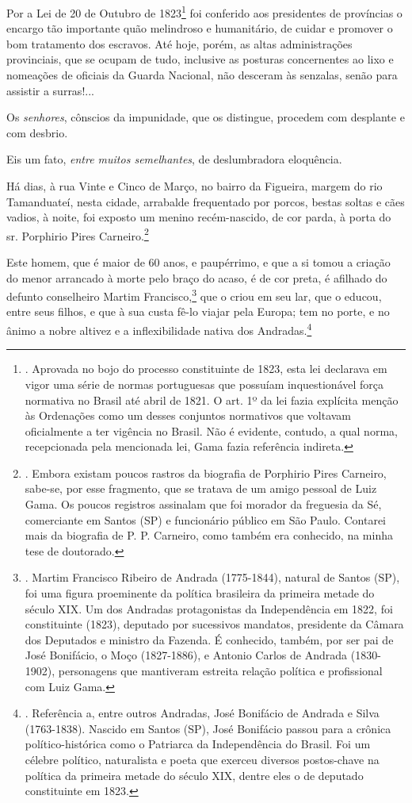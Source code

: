 Por a Lei de 20 de Outubro de 1823\footnote{. Aprovada no bojo do
  processo constituinte de 1823, esta lei declarava em vigor uma série
  de normas portuguesas que possuíam inquestionável força normativa no
  Brasil até abril de 1821. O art. 1º da lei fazia explícita menção às
  Ordenações como um desses conjuntos normativos que voltavam
  oficialmente a ter vigência no Brasil. Não é evidente, contudo, a qual
  norma, recepcionada pela mencionada lei, Gama fazia referência
  indireta.} foi conferido aos presidentes de províncias o encargo tão
importante quão melindroso e humanitário, de cuidar e promover o bom
tratamento dos escravos. Até hoje, porém, as altas administrações
provinciais, que se ocupam de tudo, inclusive as posturas concernentes
ao lixo e nomeações de oficiais da Guarda Nacional, não desceram às
senzalas, senão para assistir a surras!...

Os \emph{senhores}, cônscios da impunidade, que os distingue, procedem
com desplante e com desbrio.

Eis um fato, \emph{entre muitos semelhantes}, de deslumbradora
eloquência.

Há dias, à rua Vinte e Cinco de Março, no bairro da Figueira, margem do
rio Tamanduateí, nesta cidade, arrabalde frequentado por porcos, bestas
soltas e cães vadios, à noite, foi exposto um menino recém-nascido, de
cor parda, à porta do sr. Porphirio Pires Carneiro.\footnote{. Embora
  existam poucos rastros da biografia de Porphirio Pires Carneiro,
  sabe-se, por esse fragmento, que se tratava de um amigo pessoal de
  Luiz Gama. Os poucos registros assinalam que foi morador da freguesia
  da Sé, comerciante em Santos (SP) e funcionário público em São Paulo.
  Contarei mais da biografia de P. P. Carneiro, como também era
  conhecido, na minha tese de doutorado.}

Este homem, que é maior de 60 anos, e paupérrimo, e que a si tomou a
criação do menor arrancado à morte pelo braço do acaso, é de cor preta,
é afilhado do defunto conselheiro Martim Francisco,\footnote{. Martim
  Francisco Ribeiro de Andrada (1775-1844), natural de Santos (SP), foi
  uma figura proeminente da política brasileira da primeira metade do
  século XIX. Um dos Andradas protagonistas da Independência em 1822,
  foi constituinte (1823), deputado por sucessivos mandatos, presidente
  da Câmara dos Deputados e ministro da Fazenda. É conhecido, também,
  por ser pai de José Bonifácio, o Moço (1827-1886), e Antonio Carlos de
  Andrada (1830-1902), personagens que mantiveram estreita relação
  política e profissional com Luiz Gama.} que o criou em seu lar, que o
educou, entre seus filhos, e que à sua custa fê-lo viajar pela Europa;
tem no porte, e no ânimo a nobre altivez e a inflexibilidade nativa dos
Andradas.\footnote{. Referência a, entre outros Andradas, José Bonifácio
  de Andrada e Silva (1763-1838). Nascido em Santos (SP), José Bonifácio
  passou para a crônica político-histórica como o Patriarca da
  Independência do Brasil. Foi um célebre político, naturalista e poeta
  que exerceu diversos postos-chave na política da primeira metade do
  século XIX, dentre eles o de deputado constituinte em 1823.}

